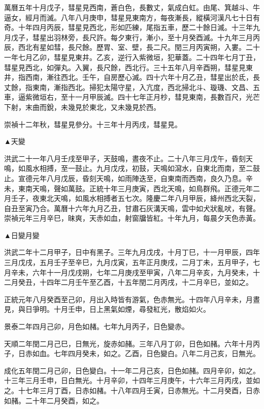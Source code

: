 \begin{pinyinscope}
萬曆五年十月戊子，彗星見西南，蒼白色，長數丈，氣成白虹。由尾、箕越斗、牛逼女，經月而滅。八年八月庚申，彗星見東南方，每夜漸長，縱橫河漢凡七十日有奇。十年四月丙辰，彗星見西北，形如匹練，尾指五車，歷二十餘日滅。十三年九月戊子，彗星出羽林旁，長尺許。每夕東行，漸小，至十月癸酉滅。十九年三月丙辰，西北有星如彗，長尺餘。歷胃、室、壁，長二尺。閏三月丙寅朔，入婁。二十一年七月乙卯，彗星見東井。乙亥，逆行入紫微垣，犯華蓋。二十四年七月丁丑，彗星見西北，如彈丸。入翼，長尺餘，西北行。三十五年八月辛酉朔，彗星見東井，指西南，漸往西北。壬午，自房歷心滅。四十六年十月乙丑，彗星出於氐，長丈餘，指東南，漸指西北。掃犯太陽守星，入亢度，西北掃北斗、璇璣、文昌、五車，逼紫微垣右，至十一月甲辰滅。四十七年正月杪，彗見東南，長數百尺，光芒下射，末曲而銳，未幾見於東北，又未幾見於西。

崇禎十二年秋，彗星見參分。十三年十月丙戌，彗星見。

▲天變

洪武二十一年八月壬戌至甲子，天鼓鳴，晝夜不止。二十八年三月戊午，昏刻天鳴，如風水相搏，至一鼓止。九月戊戌，初鼓，天鳴如瀉水，自東北而南，至二鼓止。宣德元年八月戊辰，昏刻天鳴，如雨陣迭至，自東南而西南，良久乃息。辛未，東南天鳴，聲如萬鼓。正統十年三月庚寅，西北天鳴，如鳥群飛。正德元年二月壬子，夜東北天鳴，如風水相搏者五七次。隆慶二年八月甲辰，絳州西北天裂，自丑至寅乃合。萬曆十六年九月乙丑，甘肅石灰溝天鳴，雲中如犬狀亂吠，有聲。崇禎元年三月辛巳，昧爽，天赤如血，射窗牖皆紅。十年九月，每晨夕天色赤黃。

▲日變月變

洪武二年十二月甲子，日中有黑子。三年九月戊戌，十月丁巳，十一月甲辰，四年三月戊戌，五月壬子至辛巳，九月戊寅，五年正月庚戌，二月丁未，五月甲子，七月辛未，六年十一月戊戌朔，七年二月庚戌至甲寅，八年二月辛亥，九月癸未，十二月癸丑，十四年二月壬午至乙酉，十五年閏二月丙戌，十二月辛巳，並如之。

正統元年八月癸酉至己卯，月出入時皆有游氣，色赤無光。十四年八月辛未，月晝見，與日爭明。十月壬申，日上黑氣如煙，尋發紅光，散焰如火。

景泰二年四月己卯，月色如赭。七年九月丙子，日色變赤。

天順二年閏二月己巳，日無光，旋赤如赭。三年八月丁卯，日色如赭。六年十月丙子，日赤如血。七年四月癸未，如之。乙酉，日色變白。八年二月己亥，日無光。

成化五年閏二月己卯，日色變白。十一年二月己亥，日色如赭。四月辛卯，如之。十三年三月壬申，日白無光。十月辛卯，十四年三月庚午，十六年三月丙戌，並如之。十七年三月丁酉，日赤如赭。十八年四月壬寅，日赤無光。十二月癸酉，日赤如赭。二十年二月癸酉，如之。


\end{pinyinscope}
